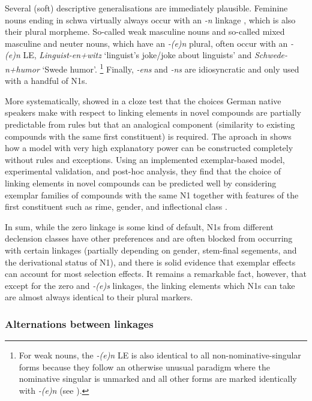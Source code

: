Several (soft) descriptive generalisations are immediately plausible.
Feminine nouns ending in schwa virtually always occur with an \textit{-n} linkage \parencite[32]{LibbenEa2002}, which is also their plural morpheme.
So-called weak masculine nouns and so-called mixed masculine and neuter nouns, which have an \textit{-(e)n} plural, often occur with an \textit{-(e)n} LE, \egg \textit{Linguist-en+witz} `linguist's joke\slash joke about linguists' and \textit{Schwede-n+humor} `Swede humor'.%
\footnote{For weak nouns, the \textit{-(e)n} LE is also identical to all non-nominative-singular forms because they follow an otherwise unusual paradigm where the nominative singular is unmarked and all other forms are marked identically with \textit{-(e)n} (see \citealt{Koepcke1995,Schaefer2016c}).}
Finally, \textit{-ens} and \textit{-ns} are idiosyncratic and only used with a handful of N1s.

More systematically, \textcite{DresslerEa2001} showed in a cloze test that the choices German native speakers make with respect to linking elements in novel compounds are partially predictable from rules but that an analogical component (similarity to existing compounds with the same first constituent) is required.
The aproach in \textcite{KrottEa2007} shows how a model with very high explanatory power can be constructed completely without rules and exceptions.
Using an implemented exemplar-based model, experimental validation, and post-hoc analysis, they find that the choice of linking elements in novel compounds can be predicted well by considering exemplar families of compounds with the same N1 together with features of the first constituent such as rime, gender, and inflectional class \parencite[47]{KrottEa2007}.

In sum, while the zero linkage is some kind of default, N1s from different declension classes have other preferences and are often blocked from occurring with certain linkages (partially depending on gender, stem-final segements, and the derivational status of N1), and there is solid evidence that exemplar effects can account for most selection effects.
It remains a remarkable fact, however, that except for the zero and \textit{-(e)s} linkages, the linking elements which N1s can take are almost always identical to their plural markers.


\subsubsection{Alternations between linkages}


